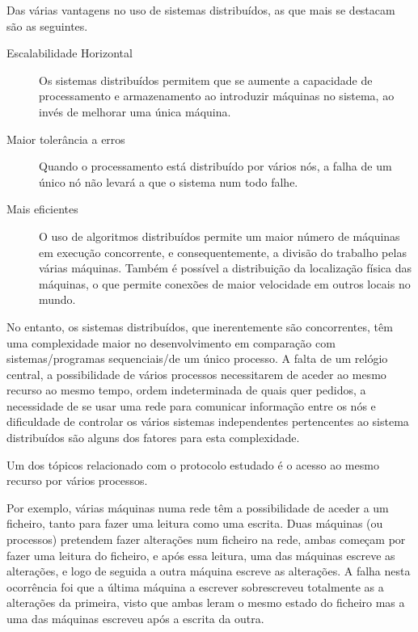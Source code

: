 Das várias vantagens no uso de sistemas distribuídos, as que mais se destacam são as seguintes.
\begin{description}
    \item [Escalabilidade Horizontal] Os sistemas distribuídos permitem que se aumente a capacidade de processamento e armazenamento ao introduzir máquinas no sistema, ao invés de melhorar uma única máquina.
	
    \item [Maior tolerância a erros]Quando o processamento está distribuído por vários nós, a falha de um único nó não levará a que o sistema num todo falhe.

    \item [Mais eficientes] O uso de algoritmos distribuídos permite um maior número de máquinas em execução concorrente, e consequentemente, a divisão do trabalho pelas várias máquinas.
	Também é possível a distribuição da localização física das máquinas, o que permite conexões de maior velocidade em outros locais no mundo.

\end{description}

No entanto, os sistemas distribuídos, que inerentemente são concorrentes, têm uma complexidade maior no desenvolvimento em comparação com sistemas/programas sequenciais/de um único processo.
A falta de um relógio central, a possibilidade de vários processos necessitarem de aceder ao mesmo recurso ao mesmo tempo, ordem indeterminada de quais quer pedidos, a necessidade de se usar uma rede para comunicar informação entre os nós e dificuldade de controlar os vários sistemas independentes pertencentes ao sistema distribuídos são alguns dos fatores para esta complexidade.

Um dos tópicos relacionado com o protocolo estudado é o acesso ao mesmo recurso por vários processos.

Por exemplo, várias máquinas numa rede têm a possibilidade de aceder a um ficheiro, tanto para fazer uma leitura como uma escrita.
Duas máquinas (ou processos) pretendem fazer alterações num ficheiro na rede, ambas começam por fazer uma leitura do ficheiro, e após essa leitura, uma das máquinas escreve as alterações, e logo de seguida a outra máquina escreve as alterações. A falha nesta ocorrência foi que a última máquina a escrever sobrescreveu totalmente as a alterações da primeira, visto que ambas leram o mesmo estado do ficheiro mas a uma das máquinas escreveu após a escrita da outra.

